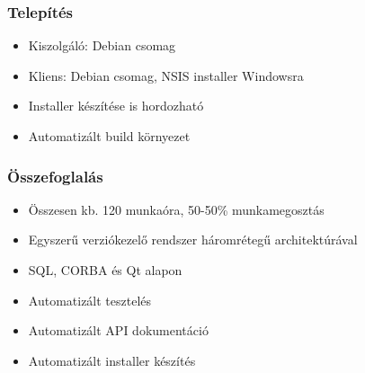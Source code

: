 \documentclass[hyperref={pdfpagelabels=false}]{beamer}
\begin{document}
\begin{frame}
\frametitle{Telepítés}
\begin{itemize}
\item Kiszolgáló: Debian csomag
\item Kliens: Debian csomag, NSIS installer Windowsra
\item Installer készítése is hordozható
\item Automatizált build környezet
\end{itemize}
\end{frame}

\begin{frame}
\frametitle{Összefoglalás}
\begin{itemize}
\item Összesen kb. 120 munkaóra, 50-50\% munkamegosztás 
\item Egyszerű verziókezelő rendszer háromrétegű architektúrával
\item SQL, CORBA és Qt alapon
\item Automatizált tesztelés
\item Automatizált API dokumentáció
\item Automatizált installer készítés
\end{itemize}
\end{frame}
\end{document}
